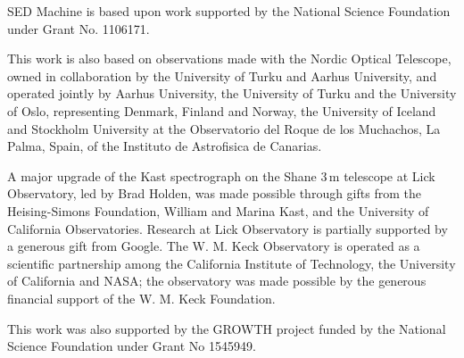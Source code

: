 \documentclass[twocolumn]{aastex631}
\begin{document}
SED Machine is based upon work supported by the National Science Foundation under Grant No. 1106171.

This work is also based on observations made with the Nordic Optical Telescope, owned in collaboration by the University of Turku and Aarhus University, and operated jointly by Aarhus University, the University of Turku and the University of Oslo, representing Denmark, Finland and Norway, the University of Iceland and Stockholm University at the Observatorio del Roque de los Muchachos, La Palma, Spain, of the Instituto de Astrofisica de Canarias.

A major upgrade of the Kast spectrograph on the Shane 3\,m telescope at Lick Observatory, led by Brad Holden, was made possible through gifts from the Heising-Simons Foundation, William and Marina Kast, and the University of California Observatories. Research at Lick Observatory is partially supported by a generous gift from Google. The W. M. Keck Observatory is operated as a scientific partnership among the California Institute of Technology, the University of California and NASA; the observatory was made possible by the generous financial support of the W. M. Keck Foundation.

This work was also supported by the GROWTH project \citep{Kasliwal2019} funded by the National Science Foundation under Grant No 1545949.







\end{document}
